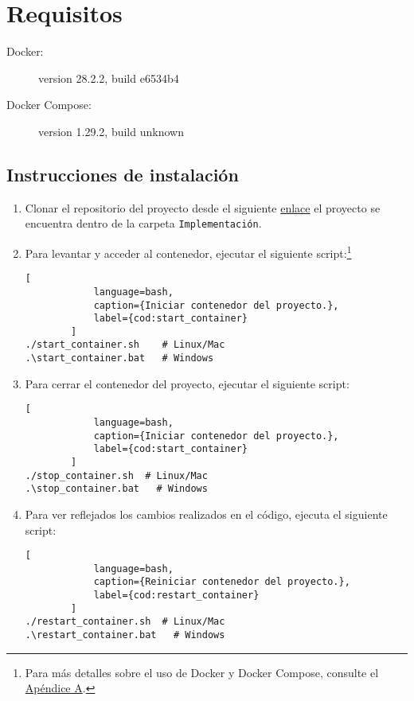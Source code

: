 	\section{Requisitos}
	\label{sec:requisitos-sistema}

	\begin{description}
		\item[Docker:] version 28.2.2, build e6534b4
		\item[Docker Compose:] version 1.29.2, build unknown
	\end{description}

	\subsection{Instrucciones de instalaci\'on}
	\label{sec:instalacion}

	\begin{enumerate}
		\item Clonar el repositorio del proyecto desde el siguiente \href{https://github.com/Ic3manMtz/Servicio-Social.git}{enlace} el proyecto se encuentra dentro de la carpeta \texttt{Implementaci\'on}.
		
		\item Para levantar y acceder al contenedor, ejecutar el siguiente script:\footnote{Para más detalles sobre el uso de Docker y Docker Compose, consulte el \hyperref[anexo:docker]{Apéndice A}.}
		\begin{lstlisting}[
			language=bash,
			caption={Iniciar contenedor del proyecto.},
			label={cod:start_container}
		]
./start_container.sh	# Linux/Mac
.\start_container.bat	# Windows
		\end{lstlisting}

		\item Para cerrar el contenedor del proyecto, ejecutar el siguiente script:
		\begin{lstlisting}[
			language=bash,
			caption={Iniciar contenedor del proyecto.},
			label={cod:start_container}
		]
./stop_container.sh  # Linux/Mac
.\stop_container.bat   # Windows
		\end{lstlisting}

		\item Para ver reflejados los cambios realizados en el código, ejecuta el siguiente script:
		\begin{lstlisting}[
			language=bash,
			caption={Reiniciar contenedor del proyecto.},
			label={cod:restart_container}
		]
./restart_container.sh  # Linux/Mac
.\restart_container.bat   # Windows
		\end{lstlisting}
	\end{enumerate}